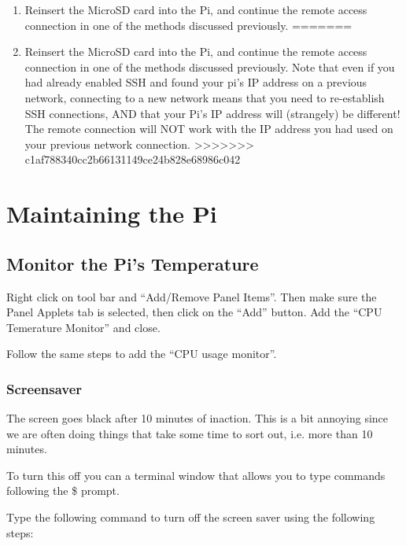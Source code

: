 \documentclass{article}\usepackage[]{graphicx}\usepackage[]{color}
\begin{document}
\begin{enumerate}
\item Reinsert the MicroSD card into the Pi, and continue the remote access connection in one of the methods discussed previously.
=======
\item Reinsert the MicroSD card into the Pi, and continue the remote access connection in one of the methods discussed previously.  Note that even if you had already enabled SSH and found your pi's IP address on a previous network, connecting to a new network means that you need to re-establish SSH connections, AND that your Pi's IP address will (strangely) be different!  The remote connection will NOT work with the IP address you had used on your previous network connection.
>>>>>>> c1af788340cc2b66131149ce24b828e68986c042

\end{enumerate}

\section{Maintaining the Pi}

\subsection{Monitor the Pi's Temperature}

Right click on tool bar and ``Add/Remove Panel Items''. Then make sure the Panel Applets tab is selected, then click on the ``Add'' button. 
Add the ``CPU Temerature Monitor'' and close.

Follow the same steps to add the ``CPU usage monitor''.

\subsubsection{Screensaver}

The screen goes black after 10 minutes of inaction. This is a bit annoying since we are often doing things that take some time to sort out, i.e. more than 10 minutes. 

To turn this off you can a terminal window that allows you to type commands following the \$ prompt. 

Type the following command to turn off the screen saver using the following steps: 
\end{document}

